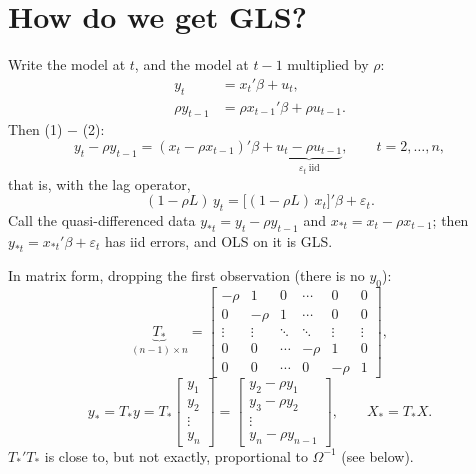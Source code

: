 \documentclass[11pt]{article}
\begin{document}
\section{How do we get GLS?}

Write the model at $t$, and the model at $t-1$ multiplied by $\rho$:
\begin{align*}
  y_{t}        &= x_{t}'\beta + u_{t}, \tag{1}\\
  \rho y_{t-1} &= \rho x_{t-1}'\beta + \rho u_{t-1}. \tag{2}
\end{align*}
Then (1) $-$ (2):
\[ y_{t} - \rho y_{t-1} = (x_{t} - \rho x_{t-1})'\beta
   + \underbrace{u_{t} - \rho u_{t-1}}_{\varepsilon_{t}\ \text{iid}},
   \qquad t = 2, \dots, n, \]
that is, with the lag operator,
\[ (1 - \rho L)\,y_{t} = \bigl[(1 - \rho L)\,x_{t}\bigr]'\beta + \varepsilon_{t}. \]
Call the quasi-differenced data $y_{*t} = y_{t} - \rho y_{t-1}$ and
$x_{*t} = x_{t} - \rho x_{t-1}$; then $y_{*t} = x_{*t}'\beta + \varepsilon_{t}$ has
iid errors, and OLS on it is GLS.

In matrix form, dropping the first observation (there is no $y_{0}$):
\[ \underbrace{T_{*}}_{(n-1)\times n} = \begin{bmatrix}
     -\rho  & 1      & 0      & \cdots & 0      & 0\\
     0      & -\rho  & 1      & \cdots & 0      & 0\\
     \vdots & \vdots & \ddots & \ddots & \vdots & \vdots\\
     0      & 0      & \cdots & -\rho  & 1      & 0\\
     0      & 0      & \cdots & 0      & -\rho  & 1
   \end{bmatrix}, \]
\[ y_{*} = T_{*}y = T_{*}\begin{bmatrix} y_{1}\\ y_{2}\\ \vdots\\ y_{n} \end{bmatrix}
   = \begin{bmatrix} y_{2} - \rho y_{1}\\ y_{3} - \rho y_{2}\\ \vdots\\ y_{n} - \rho y_{n-1} \end{bmatrix},
   \qquad X_{*} = T_{*}X. \]
$T_{*}'T_{*}$ is close to, but not exactly, proportional to $\Omega^{-1}$ (see below).
\end{document}
